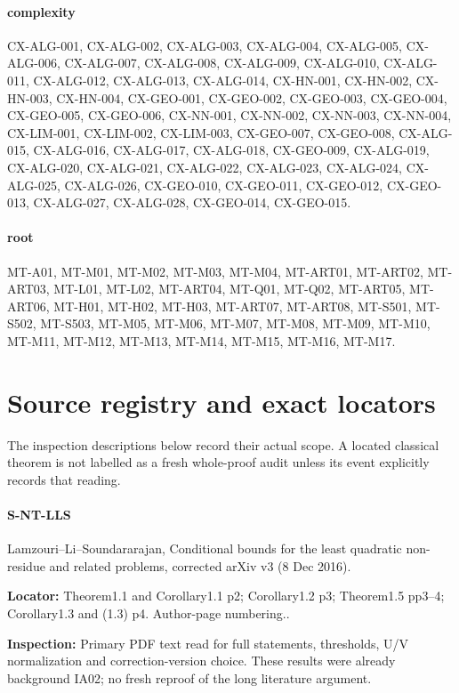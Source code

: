 \documentclass[11pt,a4paper]{article}
\begin{document}
\paragraph{complexity} CX-ALG-001, CX-ALG-002, CX-ALG-003, CX-ALG-004, CX-ALG-005, CX-ALG-006, CX-ALG-007, CX-ALG-008, CX-ALG-009, CX-ALG-010, CX-ALG-011, CX-ALG-012, CX-ALG-013, CX-ALG-014, CX-HN-001, CX-HN-002, CX-HN-003, CX-HN-004, CX-GEO-001, CX-GEO-002, CX-GEO-003, CX-GEO-004, CX-GEO-005, CX-GEO-006, CX-NN-001, CX-NN-002, CX-NN-003, CX-NN-004, CX-LIM-001, CX-LIM-002, CX-LIM-003, CX-GEO-007, CX-GEO-008, CX-ALG-015, CX-ALG-016, CX-ALG-017, CX-ALG-018, CX-GEO-009, CX-ALG-019, CX-ALG-020, CX-ALG-021, CX-ALG-022, CX-ALG-023, CX-ALG-024, CX-ALG-025, CX-ALG-026, CX-GEO-010, CX-GEO-011, CX-GEO-012, CX-GEO-013, CX-ALG-027, CX-ALG-028, CX-GEO-014, CX-GEO-015.
\paragraph{root} MT-A01, MT-M01, MT-M02, MT-M03, MT-M04, MT-ART01, MT-ART02, MT-ART03, MT-L01, MT-L02, MT-ART04, MT-Q01, MT-Q02, MT-ART05, MT-ART06, MT-H01, MT-H02, MT-H03, MT-ART07, MT-ART08, MT-S501, MT-S502, MT-S503, MT-M05, MT-M06, MT-M07, MT-M08, MT-M09, MT-M10, MT-M11, MT-M12, MT-M13, MT-M14, MT-M15, MT-M16, MT-M17.
\section*{Source registry and exact locators}
The inspection descriptions below record their actual scope. A located
classical theorem is not labelled as a fresh whole-proof audit unless
its event explicitly records that reading.

\paragraph{S-NT-LLS} Lamzouri–\allowbreak{}Li–\allowbreak{}Soundararajan, Conditional bounds for the least quadratic non-residue and related problems, corrected arXiv v3 (8 Dec 2016).

\textbf{Locator:} Theorem1.\allowbreak{}1 and Corollary1.\allowbreak{}1 p2; Corollary1.\allowbreak{}2 p3; Theorem1.\allowbreak{}5 pp3–\allowbreak{}4; Corollary1.\allowbreak{}3 and (1.\allowbreak{}3) p4.\allowbreak{} Author-page numbering.\allowbreak{}.

\textbf{Inspection:} Primary PDF text read for full statements, thresholds, U/\allowbreak{}V normalization and correction-version choice.\allowbreak{} These results were already background IA02; no fresh reproof of the long literature argument.\allowbreak{}
\end{document}
